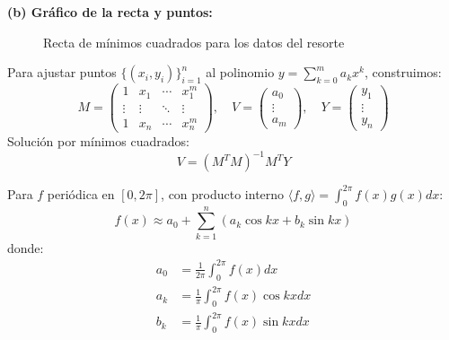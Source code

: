 \begin{prob}
\begin{myproof}
\textbf{(b) Gráfico de la recta y puntos:}
\begin{figure}[H]
\centering
{}
\caption{Recta de mínimos cuadrados para los datos del resorte}
\end{figure}
\end{myproof}
\end{prob}


\begin{prob}
Para ajustar puntos $\{(x_i,y_i)\}_{i=1}^n$ al polinomio $y = \sum_{k=0}^m a_k x^k$, construimos:
\[
M = \begin{pmatrix}
1 & x_1 & \cdots & x_1^m \\
\vdots & \vdots & \ddots & \vdots \\
1 & x_n & \cdots & x_n^m
\end{pmatrix}, \quad
V = \begin{pmatrix} a_0 \\ \vdots \\ a_m \end{pmatrix}, \quad
Y = \begin{pmatrix} y_1 \\ \vdots \\ y_n \end{pmatrix}
\]
Solución por mínimos cuadrados:
\[
V = (M^T M)^{-1} M^T Y
\]
\end{prob}

\begin{definition}
Para $f$ periódica en $[0, 2\pi]$, con producto interno $\langle f, g \rangle = \int_0^{2\pi} f(x) g(x)  dx$:
\[
f(x) \approx a_0 + \sum_{k=1}^n (a_k \cos kx + b_k \sin kx)
\]
donde:
\begin{align*}
a_0 &= \frac{1}{2\pi} \int_0^{2\pi} f(x)  dx \\
a_k &= \frac{1}{\pi} \int_0^{2\pi} f(x) \cos kx  dx \\
b_k &= \frac{1}{\pi} \int_0^{2\pi} f(x) \sin kx  dx
\end{align*}
\end{definition}

